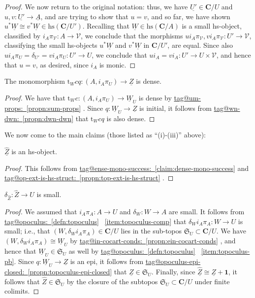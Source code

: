 \documentclass{amsart}
\makeatletter
\newcommand\bC{\mathbf{C}}
\newcommand\cV{\mathcal{V}}
\newcommand\fS{\mathfrak{S}}
\newcommand\hs{\mathrm{hs}}
\newcommand\rt{\mathrm{t}}
\newcommand\tm{\mathbf{1}}
\newcommand\und[1]{\underline{#1}}
\newcommand\wh[1]{\widehat{#1}}
\newcommand\tagword[1]{\csname tag@#1\endcsname}
\def\label@tag#1:#2\@nil{#1}
\newcommand\labeltag[1]{\label@tag#1:\@nil}
\newcommand\jref[1]{%
  \texorpdfstring%
    {\hyperref[#1]{\tagword{\labeltag{#1}}~\ref*{#1}}}%
    {\tagword{\labeltag{#1}}~\ref*{#1}}%
}
\theoremstyle{definition}
\theoremstyle{remark}
\theoremstyle{plainwithref}
\makeatother
\begin{document}
\begin{proof}
We now return to the original notation: thus, we have \( \und{U'} \in \bC / U \) and \( u,v \colon \und{U'} \to \und{A} \), and are trying to show that \( u = v \), and so far, we have shown \( u^* \und{W} \cong v^* \und{W} \in \hs(\bC / U') \).
Recalling that \( \und{W} \in \hs(\bC / A) \) is a small hs-object, classified by \( i_A \pi_\cV \colon A \to \cV \), we conclude that the morphisms \( u i_A \pi_{\cV}, v i_A \pi_{\cV} \colon U' \to \cV \), classifying the small hs-objects \( u^* \und{W} \) and \( v^* \und{W} \) in \( \bC / U' \), are equal.
  Since also \( u i_A \pi_U = \delta_{U'} = v i_A \pi_U \colon U' \to U \), we conclude that \( u i_A = v i_A \colon U' \to U \times \cV \), and hence that \( u = v \), as desired, since \( i_A \) is monic.
\end{proof}

\begin{claim} \label{claim:dense-mono-success}
  The monomorphism \( \rt_{W} c q \colon (A, i_A \pi_U) \to \und Z \) is dense.
\end{claim}

\begin{proof}
  We have that \( \rt_W c \colon (A, i_A \pi_U) \to \und W_U \) is dense by \jref{propn:sum-props}.
  Since \( q \colon \und W_U \to \und Z \) is initial, it follows from \jref{propn:dwn-dwn} that \( \rt_W c q \) is also dense.
\end{proof}

We now come to the main claims (those listed as ``(i)-(iii)'' above):
\begin{claim}
  \( \und{\wh Z} \) is an hs-object.
\end{claim}

\begin{proof}
  This follows from \jref{claim:dense-mono-success} and \jref{propn:top-ext-is-hs-struct}.
\end{proof}

\begin{claim}
  \( \delta_{\wh Z} \colon\wh Z \to U \) is small.
\end{claim}

\begin{proof}
  We assumed that \( i_A \pi_A \colon A \to U \) and \( \delta_W \colon W \to A \) are small.
  It follows from \jref{defn:topoculus}~\ref{item:topoculus-comp} that \( \delta_W i_A \pi_A \colon W \to U \) is small; i.e., that \( (W, \delta_W i_A \pi_A) \in \bC / U \) lies in the sub-topos \( \fS_U \subset \bC / U \).
  We have \( (W, \delta_W i_A \pi_A) \cong \und W_U \) by \jref{propn:ein-cocart-conds}, and hence that \( \und W_U \in \fS_U \) as well by \jref{defn:topoculus}~\ref{item:topoculus-pb}.
  Since \( q \colon \und W_U \to \und Z \) is an epi, it follows from \jref{propn:topoculus-epi-closed} that \( \und Z \in \fS_U \).
  Finally, since \( \und {\wh Z} \cong \und Z + \tm \), it follows that \( \wh Z \in \fS_U \) by the closure of the subtopos \( \fS_U \subset \bC / U \) under finite colimits.
\end{proof}
\end{document}
